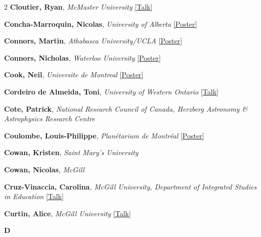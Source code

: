 \begin{small}
\begin{multicols}{2}
\textbf{Cloutier, Ryan}, {\footnotesize\textit{McMaster University}} \hyperref[abstract-page-talk-28]{\scriptsize\textcolor{cascablue}{[Talk]}}\par
\textbf{Concha-Marroquin, Nicolas}, {\footnotesize\textit{University of Alberta}} \hyperref[poster-abstract-page-talk-141]{\scriptsize\textcolor{cascateal}{[Poster]}}\par
\textbf{Connors, Martin}, {\footnotesize\textit{Athabasca University/UCLA}} \hyperref[poster-abstract-page-talk-270]{\scriptsize\textcolor{cascateal}{[Poster]}}\par
\textbf{Connors, Nicholas}, {\footnotesize\textit{Waterloo University}} \hyperref[poster-abstract-page-talk-312]{\scriptsize\textcolor{cascateal}{[Poster]}}\par
\textbf{Cook, Neil}, {\footnotesize\textit{Universite de Montreal}} \hyperref[poster-abstract-page-talk-105]{\scriptsize\textcolor{cascateal}{[Poster]}}\par
\textbf{Cordeiro de Almeida, Toni}, {\footnotesize\textit{University of Western Ontario}} \hyperref[abstract-page-talk-265]{\scriptsize\textcolor{cascablue}{[Talk]}}\par
\textbf{Cote, Patrick}, {\footnotesize\textit{National Research Council of Canada, Herzberg Astronomy \& Astrophysics Research Centre}}\par
\textbf{Coulombe, Louis-Philippe}, {\footnotesize\textit{Planétarium de Montréal}} \hyperref[poster-abstract-page-talk-56]{\scriptsize\textcolor{cascateal}{[Poster]}}\par
\textbf{Cowan, Kristen}, {\footnotesize\textit{Saint Mary's University}}\par
\textbf{Cowan, Nicolas}, {\footnotesize\textit{McGill}}\par
\textbf{Cruz-Vinaccia, Carolina}, {\footnotesize\textit{McGill University, Department of Integrated Studies in Education}} \hyperref[abstract-page-talk-310]{\scriptsize\textcolor{cascablue}{[Talk]}}\par
\textbf{Curtin, Alice}, {\footnotesize\textit{McGill University}} \hyperref[abstract-page-talk-134]{\scriptsize\textcolor{cascablue}{[Talk]}}\par

{\sffamily\bfseries\color{cascablue}\large D}\\[2pt]


\end{multicols}
\end{small}
